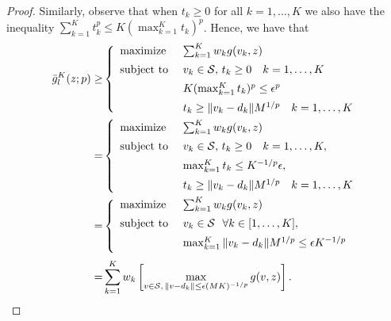 \begin{proof}
  Similarly, observe that when $t_k\geq 0$ for all $k = 1,\dots, K$ we also have the inequality $\sum_{k=1}^K t_k^p \leq K (\max_{k=1}^K t_k)^p$. Hence, we have that
  \begin{align*}
    \bar{g}^K_l(z; p)
    \geq &
    \left\{
      \begin{array}{l@{~~~~}l}
				\mbox{maximize} & \sum_{k=1}^K w_k g(v_k, z) \\[0.5em]
        \mbox{subject to} & v_k\in \supp, \, t_k\geq 0 \quad k = 1,\dots,K\\[0.5em]
             &  K (\max_{k=1}^K t_k)^p \leq \epsilon^p\\[0.5em]
             &  t_k\geq \norm{v_k-d_k} M^{1/p} \quad k = 1,\dots,K
      \end{array}
           \right.\\
    = &
    \left\{
      \begin{array}{l@{~~~~}l}
				\mbox{maximize} & \sum_{k=1}^K w_k g(v_k, z) \\[0.5em]
        \mbox{subject to} & v_k\in \supp, \, t_k\geq 0 \quad k = 1,\dots,K,\\[0.5em]
             &   \max_{k=1}^K t_k \leq K^{-1/p} \epsilon,\\[0.5em]
             &  t_k\geq \norm{v_k-d_k} M^{1/p} \quad k = 1,\dots,K
      \end{array}
               \right.\\
    = &    \left\{
      \begin{array}{l@{~~~~}l}
				\mbox{maximize} & \sum_{k=1}^K w_k g(v_k, z) \\[0.5em]
        \mbox{subject to} & v_k\in \supp~~\forall k \in [1,\dots,K],\\[0.5em]
             &  \max_{k=1}^K \norm{v_k-d_k} M^{1/p} \leq \epsilon K^{-1/p}\\[0.5em]
      \end{array}
        \right.\\
    = &  \sum_{k=1}^K w_k \left[\max_{v\in \supp,\,\norm{v-d_k}\leq \epsilon (MK)^{-1/p}} g(v, z)\right].
  \end{align*}


\end{proof}
